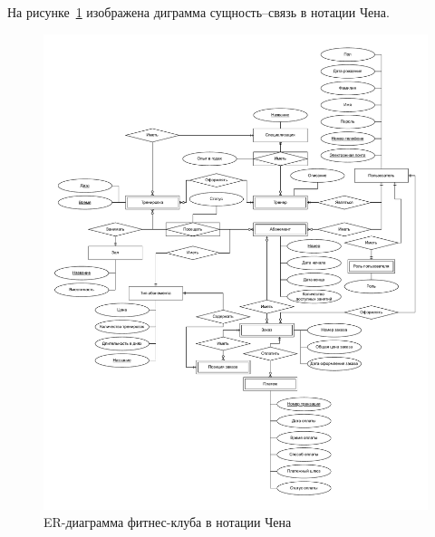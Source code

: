 На рисунке~\ref{fig:er-chen} изображена диграмма сущность--связь в нотации Чена.

\begin{figure}[ht!]
	\begin{center}
		\includegraphics[scale=0.62]{./diag/er-chen.pdf}
	\end{center}
	\caption{ER-диаграмма фитнес-клуба в нотации Чена}
	\label{fig:er-chen}
\end{figure}

